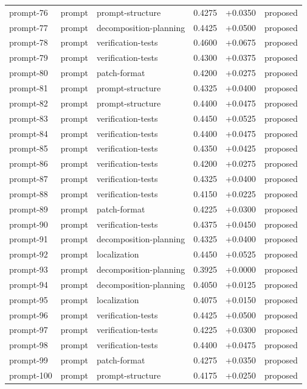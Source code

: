 \begin{center}
\begin{longtable}{llp{5.2cm}rrl}
prompt-76 & prompt & prompt-structure & 0.4275 & +0.0350 & proposed \\
prompt-77 & prompt & decomposition-planning & 0.4425 & +0.0500 & proposed \\
prompt-78 & prompt & verification-tests & 0.4600 & +0.0675 & proposed \\
prompt-79 & prompt & verification-tests & 0.4300 & +0.0375 & proposed \\
prompt-80 & prompt & patch-format & 0.4200 & +0.0275 & proposed \\
prompt-81 & prompt & prompt-structure & 0.4325 & +0.0400 & proposed \\
prompt-82 & prompt & prompt-structure & 0.4400 & +0.0475 & proposed \\
prompt-83 & prompt & verification-tests & 0.4450 & +0.0525 & proposed \\
prompt-84 & prompt & verification-tests & 0.4400 & +0.0475 & proposed \\
prompt-85 & prompt & verification-tests & 0.4350 & +0.0425 & proposed \\
prompt-86 & prompt & verification-tests & 0.4200 & +0.0275 & proposed \\
prompt-87 & prompt & verification-tests & 0.4325 & +0.0400 & proposed \\
prompt-88 & prompt & verification-tests & 0.4150 & +0.0225 & proposed \\
prompt-89 & prompt & patch-format & 0.4225 & +0.0300 & proposed \\
prompt-90 & prompt & verification-tests & 0.4375 & +0.0450 & proposed \\
prompt-91 & prompt & decomposition-planning & 0.4325 & +0.0400 & proposed \\
prompt-92 & prompt & localization & 0.4450 & +0.0525 & proposed \\
prompt-93 & prompt & decomposition-planning & 0.3925 & +0.0000 & proposed \\
prompt-94 & prompt & decomposition-planning & 0.4050 & +0.0125 & proposed \\
prompt-95 & prompt & localization & 0.4075 & +0.0150 & proposed \\
prompt-96 & prompt & verification-tests & 0.4425 & +0.0500 & proposed \\
prompt-97 & prompt & verification-tests & 0.4225 & +0.0300 & proposed \\
prompt-98 & prompt & verification-tests & 0.4400 & +0.0475 & proposed \\
prompt-99 & prompt & patch-format & 0.4275 & +0.0350 & proposed \\
prompt-100 & prompt & prompt-structure & 0.4175 & +0.0250 & proposed \\
\bottomrule\end{longtable}\end{center}
\clearpage
